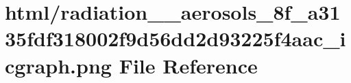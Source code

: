 \hypertarget{radiation____aerosols__8f__a3135fdf318002f9d56dd2d93225f4aac__icgraph_8png}{}\section{html/radiation\+\_\+\+\_\+aerosols\+\_\+8f\+\_\+a3135fdf318002f9d56dd2d93225f4aac\+\_\+icgraph.png File Reference}
\label{radiation____aerosols__8f__a3135fdf318002f9d56dd2d93225f4aac__icgraph_8png}
